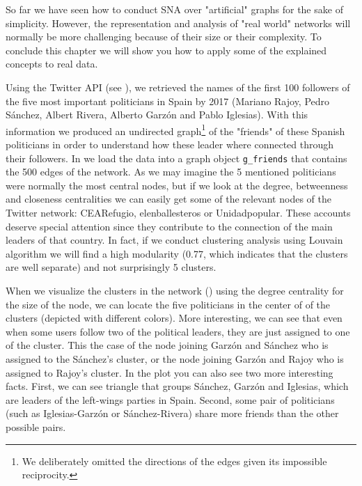 So far we have seen how to conduct SNA over "artificial" graphs for the sake of simplicity. However, the representation and analysis of "real world" networks will normally be more challenging because of their size or their complexity. To conclude this chapter we will show you how to apply some of the explained concepts to real data.

Using the Twitter API (see ), we retrieved the names of the first 100 followers of the five most important politicians in Spain by 2017 (Mariano Rajoy, Pedro Sánchez, Albert Rivera, Alberto Garzón and Pablo Iglesias). With this information we produced an undirected graph\footnote{We deliberately omitted the directions of the edges given its impossible reciprocity.} of the "friends" of these Spanish politicians in order to understand how these leader where connected through their followers. In  we load the data into a graph object \texttt{g_friends} that contains the 500 edges of the network. As we may imagine the 5 mentioned politicians were normally the most central nodes, but if we look at the degree, betweenness and closeness centralities we can easily get some of the relevant nodes of the Twitter network: CEARefugio, elenballesteros or Unidadpopular. These accounts deserve special attention since they contribute to the connection of the main leaders of that country. In fact, if we conduct clustering analysis using Louvain algorithm we will find a high modularity (0.77, which indicates that the clusters are well separate) and not surprisingly 5 clusters. 


When we visualize the clusters in the network () using the degree centrality for the size of the node, we can locate the five politicians in the center of of the clusters (depicted with different colors). More interesting, we can see that even when some users follow two of the political leaders, they are just assigned to one of the cluster. This the case of the node joining Garzón and Sánchez who is assigned to the Sánchez's cluster, or the node joining Garzón and Rajoy who is assigned to Rajoy's cluster. In the plot you can also see two more interesting facts. First, we can see triangle that groups Sánchez, Garzón and Iglesias, which are leaders of the left-wings parties in Spain. Second, some pair of politicians (such as Iglesias-Garzón or Sánchez-Rivera) share more friends than the other possible pairs. 

